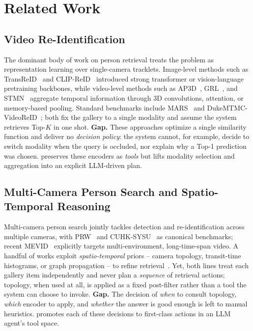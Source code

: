 \section{Related Work}
\label{sec:related}

\subsection{Video Re-Identification}
\label{ssec:rel_videoreid}
The dominant body of work on person retrieval treats the problem as
representation learning over single-camera tracklets. Image-level methods
such as TransReID~\cite{he2021transreid} and CLIP-ReID~\cite{li2023clipreid}
introduced strong transformer or vision-language pretraining backbones,
while video-level methods such as AP3D~\cite{gu2020ap3d},
GRL~\cite{liu2021grl}, and STMN~\cite{eom2021stmn} aggregate temporal
information through 3D convolutions, attention, or memory-based pooling.
Standard benchmarks include MARS~\cite{zheng2016mars} and
DukeMTMC-VideoReID~\cite{wu2018duke}; both fix the gallery to a single
modality and assume the system retrieves Top-$K$ in one shot.
\textbf{Gap.} These approaches optimize a single similarity function and
deliver no \emph{decision policy}: the system cannot, for example, decide
to switch modality when the query is occluded, nor explain why a Top-1
prediction was chosen. \method{} preserves these encoders as
\emph{tools} but lifts modality selection and aggregation into an explicit
LLM-driven plan.

\subsection{Multi-Camera Person Search and Spatio-Temporal Reasoning}
\label{ssec:rel_mcps}
Multi-camera person search jointly tackles detection and re-identification
across multiple cameras, with PRW~\cite{zheng2017prw} and
CUHK-SYSU~\cite{xiao2017cuhksysu} as canonical benchmarks; recent
MEVID~\cite{davila2023mevid} explicitly targets multi-environment,
long-time-span video. A handful of works exploit
\emph{spatio-temporal} priors -- camera topology, transit-time histograms,
or graph propagation -- to refine retrieval~\cite{lv2018global,wang2019stp}.
Yet, both lines treat each gallery item independently and never plan a
\emph{sequence} of retrieval actions; topology, when used at all, is
applied as a fixed post-filter rather than a tool the system can choose
to invoke. \textbf{Gap.} The decision of \emph{when} to consult topology,
\emph{which} encoder to apply, and \emph{whether} the answer is good
enough is left to manual heuristics. \method{} promotes each of these
decisions to first-class actions in an LLM agent's tool space.

